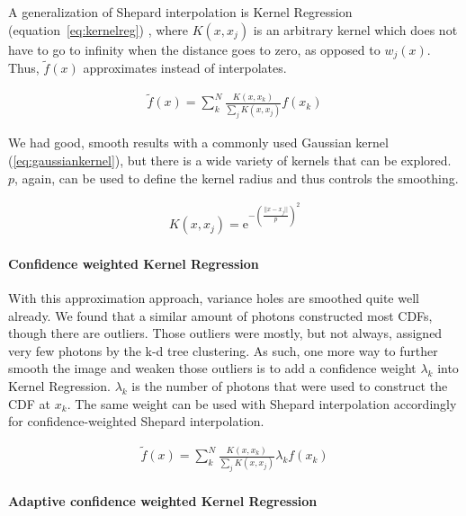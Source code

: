 A generalization of Shepard interpolation is Kernel Regression (equation~\ref{eq:kernelreg}) \parencite{DBLP:conf/siggraph/AnjyoLP14}, where $K(x, x_j)$ is an arbitrary kernel which does not have to go to infinity when the distance goes to zero, as opposed to $w_j(x)$. Thus, $\widetilde{f}(x)$ approximates instead of interpolates. 

\begin{align}\label{eq:kernelreg}
\widetilde{f}(x) = \sum_{k}^{N}\frac{K(x,x_k)}{\sum\nolimits_{j}K(x, x_j)}f(x_k)
\end{align}

We had good, smooth results with a commonly used Gaussian kernel (\ref{eq:gaussiankernel}), but there is a wide variety of kernels that can be explored. $p$, again, can be used to define the kernel radius and thus controls the smoothing.

\begin{align}\label{eq:gaussiankernel}
K(x, x_j) = \mathrm{e}^{-\left(\frac{||x-x_j||}{p}\right)^2}
\end{align}

\paragraph{Confidence weighted Kernel Regression}
\label{ch:ckernelreg}
With this approximation approach, variance holes are smoothed quite well already. We found that a similar amount of photons constructed most CDFs, though there are outliers. Those outliers were mostly, but not always, assigned very few photons by the k-d tree clustering. As such, one more way to further smooth the image and weaken those outliers is to add a confidence weight $\lambda_k$ into Kernel Regression. $\lambda_k$ is the number of photons that were used to construct the CDF at $x_k$. The same weight can be used with Shepard interpolation accordingly for confidence-weighted Shepard interpolation.

\begin{align}\label{eq:ckernelreg}
\widetilde{f}(x) = \sum_{k}^{N}\frac{K(x,x_k)}{\sum\nolimits_{j}K(x, x_j)}\lambda_kf(x_k)
\end{align}

\paragraph{Adaptive confidence weighted Kernel Regression}
\label{ch:adckernelreg}

